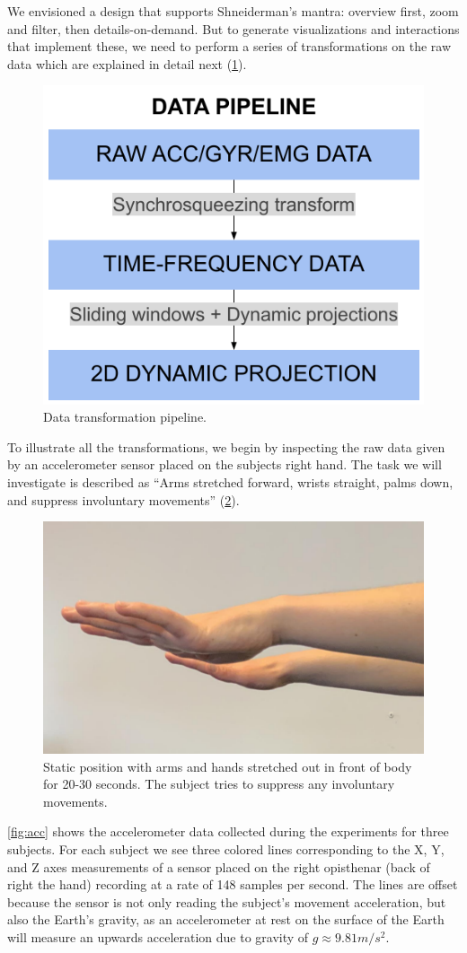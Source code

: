 We envisioned a design that supports Shneiderman's mantra: overview first, zoom and filter, then details-on-demand. But to generate visualizations and interactions that implement these, we need to perform a series of transformations on the raw data which are explained in detail next (\cref{fig:nemo-pipe}). 

\begin{figure}[ht]
\centering
\includegraphics[width=.5\linewidth]{figures/nemo/simple-pipeline.pdf}
\caption{Data transformation pipeline.}
\label{fig:nemo-pipe}
\end{figure}

To illustrate all the transformations, we begin by inspecting the raw data given by an accelerometer sensor placed on the subjects right hand. The task we will investigate is described as ``Arms stretched forward, wrists straight, palms down, and suppress involuntary movements'' (\cref{fig:hands}).

\begin{figure}[ht]
\centering
\includegraphics[width=.5\linewidth]{figures/nemo/hands.png}
\caption{Static position with arms and hands stretched out in front of body for 20-30 seconds. The subject tries to suppress any involuntary movements.}
\label{fig:hands}
\end{figure}

\cref{fig:acc} shows the accelerometer data collected during the experiments for three subjects. For each subject we see three colored lines corresponding to the X, Y, and Z axes measurements of a sensor placed on the right opisthenar (back of right the hand) recording at a rate of 148 samples per second. The lines are offset because the sensor is not only reading the subject's movement acceleration, but also the Earth's gravity, as an accelerometer at rest on the surface of the Earth will measure an upwards acceleration due to gravity of $g \approx 9.81 m/s^2$. 

